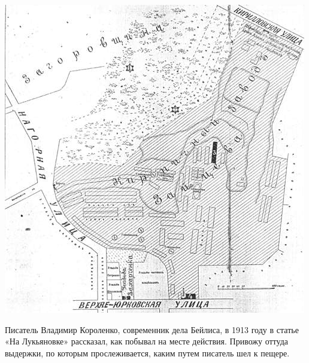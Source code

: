 \begin{center}
\includegraphics[width=\linewidth]{chast-kirvys/beylis/190x-beylis-karta.jpg}
\end{center}


Писатель Владимир Короленко, современник дела Бейлиса, в 1913 году в статье «На Лукьяновке» рассказал, как побывал на месте действия. Привожу оттуда  выдержки, по которым прослеживается, каким путем писатель шел к пещере.

